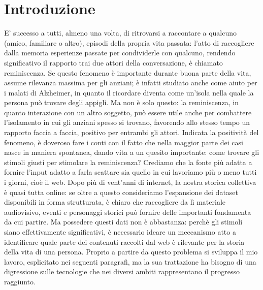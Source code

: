 \documentclass[sigproc-sp.tex]{subfiles}
\begin{document}
\section{Introduzione}
E’ successo a tutti, almeno una volta, di ritrovarsi a raccontare a qualcuno (amico, familiare o altro), episodi della propria vita passata: l’atto di raccogliere dalla memoria esperienze passate per condividerle con qualcuno, rendendo significativo il rapporto trai due attori della conversazione, è chiamato reminiscenza. Se questo fenomeno è importante durante buona parte della vita, assume rilevanza massima per gli anziani; è infatti studiato anche come aiuto per i malati di Alzheimer, in quanto il ricordare diventa come un’isola nella quale la persona può trovare degli appigli. Ma non è solo questo: la reminiscenza, in quanto interazione con un altro soggetto, può essere utile anche per combattere l’isolamento in cui gli anziani spesso si trovano, favorendo allo stesso tempo un rapporto faccia a faccia, positivo per entrambi gli attori.
Indicata la positività del fenomeno, è doveroso fare i conti con il fatto che nella maggior parte dei casi nasce in maniera spontanea, dando vita a un quesito importante: come trovare gli stimoli giusti per stimolare la reminiscenza? Crediamo che la fonte più adatta a fornire l’input adatto a farla scattare sia quello in cui lavoriamo più o meno tutti i giorni, cioè il web. Dopo più di vent’anni di internet, la nostra storica collettiva è quasi tutta online: se oltre a questo consideriamo l’espansione dei dataset disponibili in forma strutturata, è chiaro che raccogliere da lì materiale audiovisivo, eventi e personaggi storici può fornire delle importanti fondamenta da cui partire.
Ma possedere questi dati non è abbastanza: perchè gli stimoli siano effettivamente significativi, è necessario ideare un meccanismo atto a identificare quale parte dei contenuti raccolti dal web è rilevante per la storia della vita di una persona. Proprio a partire da questo problema si sviluppa il mio lavoro, esplicitato nei seguenti paragrafi, ma la sua trattazione ha bisogno di una digressione sulle tecnologie che nei diversi ambiti rappresentano il progresso raggiunto.
\end{document}

